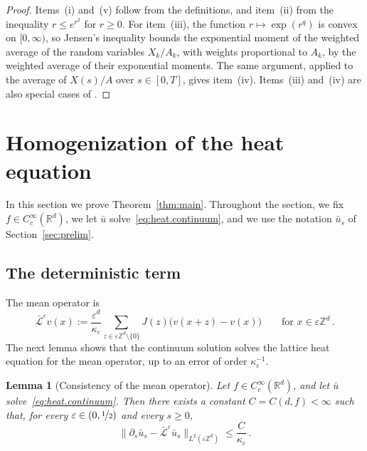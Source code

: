 \documentclass[11pt]{amsart}
\newtheorem{lemma}[theorem]{Lemma}
\numberwithin{equation}{section}
\newcommand{\Z}{\mathbb{Z}}
\newcommand{\R}{\mathbb{R}}
\newcommand{\eps}{\varepsilon}
\newcommand{\Lbar}{\bar{\mathcal{L}}^\varepsilon}
\newcommand{\nf}{\nicefrac}
\begin{document}
\begin{proof}
Items~(i) and~(v) follow from the definitions, and item~(ii) from the inequality $r \leq e^{r^2}$ for $r \geq 0$.
For item~(iii), the function $r \mapsto \exp(r^q)$ is convex on $[0,\infty)$, so Jensen's inequality bounds the exponential moment of the weighted average of the random variables $X_k/A_k$, with weights proportional to $A_k$, by the weighted average of their exponential moments.
The same argument, applied to the average of $X(s)/A$ over $s \in [0,T]$, gives item~(iv).
Items~(iii) and~(iv) are also special cases of \citet*[Lemma~A.4]{AKM2019}.
\end{proof}

\section{Homogenization of the heat equation} \label{sec:proof}

In this section we prove Theorem~\ref{thm:main}.
Throughout the section, we fix $f \in C^\infty_c(\R^d)$, we let $\bar u$ solve~\eqref{eq:heat.continuum}, and we use the notation $\bar u_s$ of Section~\ref{sec:prelim}.

\subsection{The deterministic term} \label{sec:mean}

The mean operator is
\begin{equation} \label{eq:def.Lbar}
    \Lbar v(x) := \frac{\eps^d}{\kappa_\eps} \sum_{z \in \eps \Z^d \setminus \{0\}} J(z) \bigl( v(x + z) - v(x) \bigr) \qquad \text{for } x \in \eps \Z^d\,.
\end{equation}
The next lemma shows that the continuum solution solves the lattice heat equation for the mean operator, up to an error of order $\kappa_\eps^{-1}$.

\begin{lemma}[Consistency of the mean operator] \label{lem:mean}
Let $f \in C^\infty_c(\R^d)$, and let $\bar u$ solve~\eqref{eq:heat.continuum}.
Then there exists a constant $C = C(d, f) < \infty$ such that, for every $\eps \in (0, \nf12)$ and every $s \geq 0$,
\begin{equation*}
    \bigl\| \partial_s \bar u_s - \Lbar \bar u_s \bigr\|_{L^2(\eps \Z^d)} \leq \frac{C}{\kappa_\eps}\,.
\end{equation*}
\end{lemma}
\end{document}

